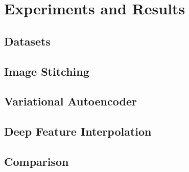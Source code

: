 \documentclass[
     11pt,         %
     a4paper,      %
     oneside,
     ]{article}
\begin{document}
\section{Experiments and Results}
\subsection{Datasets}
\subsection{Image Stitching}
\subsection{Variational Autoencoder}
\subsection{Deep Feature Interpolation}
\subsection{Comparison}
\cite{dummyEntry}


\newpage
{}


\end{document}
